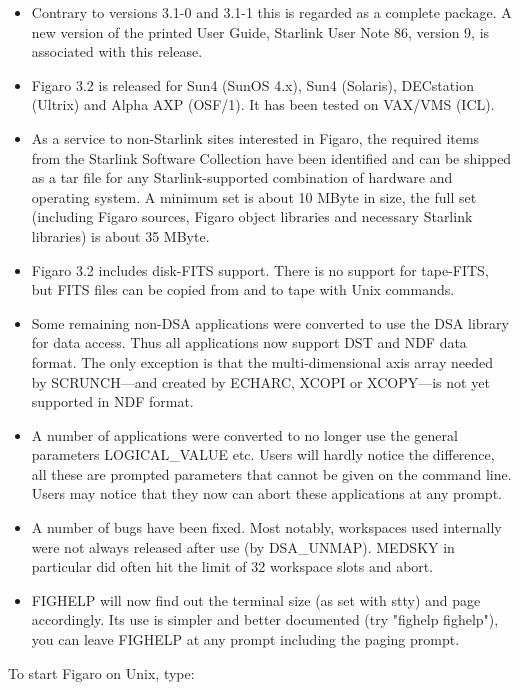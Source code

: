 \documentclass[11pt,twoside]{article}
\newcommand{\latorhtm}[2]{#1}
\newcommand{\latorhtm}[2]{#2}
\begin{document}
\begin{itemize}
\item
   Contrary to versions 3.1-0 and 3.1-1 this is regarded as a complete
   package.  A new version of the printed User Guide, Starlink User
   Note 86, version 9, is associated with this release.
\item
   Figaro 3.2 is released for Sun4 (SunOS 4.x), Sun4 (Solaris),
   DECstation (Ultrix) and Alpha AXP (OSF/1).  It has been tested on
   VAX/VMS (ICL).
\item
   As a service to non-Starlink sites interested in Figaro, the required
   items from the Starlink Software Collection have been identified and
   can be shipped as a tar file for any Starlink-supported combination
   of hardware and operating system.  A minimum set is about 10 MByte in
   size, the full set (including Figaro sources, Figaro object libraries
   and necessary Starlink libraries) is about 35 MByte.
\item
   Figaro 3.2 includes disk-FITS support.  There is no support for
   tape-FITS, but FITS files can be copied from and to tape with Unix
   commands.
\item
   Some remaining non-DSA applications were converted to use the DSA
   library for data access.  Thus all applications now support DST and
   NDF data format.  The only exception is that the multi-dimensional
   axis array needed by SCRUNCH\latorhtm{---}{-}and created by ECHARC,
   XCOPI or XCOPY\latorhtm{---}{-}is not yet supported in NDF format.
\item
   A number of applications were converted to no longer use the general
   parameters LOGICAL\_VALUE etc.  Users will hardly notice the
   difference, all these are prompted parameters that cannot be given on
   the command line.  Users may notice that they now can abort these
   applications at any prompt.
\item
   A number of bugs have been fixed.  Most notably, workspaces used
   internally were not always released after use (by DSA\_UNMAP).  MEDSKY
   in particular did often hit the limit of 32 workspace slots and
   abort.
\item
   FIGHELP will now find out the terminal size (as set with stty) and
   page accordingly.  Its use is simpler and better documented (try
   "fighelp fighelp"), you can leave FIGHELP at any prompt including the
   paging prompt.
\end{itemize}

   To start Figaro on Unix, type:
\end{document}
